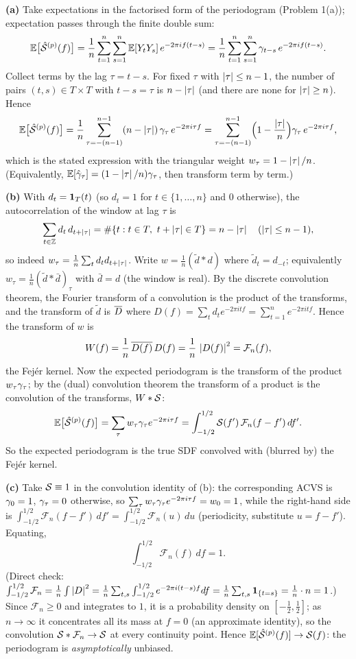 \documentclass[11pt]{article}
\begin{document}
\textbf{(a)} Take expectations in the factorised form of the periodogram (Problem 1(a)); expectation passes through the finite double sum:
\[
\mathbb{E}\bigl[\hat{\mathcal{S}}^{(p)}(f)\bigr]
=\frac1n\sum_{t=1}^{n}\sum_{s=1}^{n}\mathbb{E}[Y_tY_s]\,e^{-2\pi i f(t-s)}
=\frac1n\sum_{t=1}^{n}\sum_{s=1}^{n}\gamma_{t-s}\,e^{-2\pi i f(t-s)}.
\]
Collect terms by the lag $\tau=t-s$. For fixed $\tau$ with $\left\lvert \tau \right\rvert\le n-1$, the number of pairs $(t,s)\in T\times T$ with $t-s=\tau$ is $n-\left\lvert \tau \right\rvert$ (and there are none for $\left\lvert \tau \right\rvert\ge n$). Hence
\[
\mathbb{E}\bigl[\hat{\mathcal{S}}^{(p)}(f)\bigr]
=\frac1n\sum_{\tau=-(n-1)}^{n-1}(n-\left\lvert \tau \right\rvert)\,\gamma_\tau\,e^{-2\pi i\tau f}
=\sum_{\tau=-(n-1)}^{n-1}\Bigl(1-\frac{\left\lvert \tau \right\rvert}{n}\Bigr)\gamma_\tau\,e^{-2\pi i\tau f},
\]
which is the stated expression with the triangular weight $w_\tau=1-\left\lvert \tau \right\rvert/n$. (Equivalently, $\mathbb{E}[\hat{\gamma}_\tau]=(1-\left\lvert \tau \right\rvert/n)\gamma_\tau$, then transform term by term.)

\textbf{(b)} With $d_t=\mathbf{1}_T(t)$ (so $d_t=1$ for $t\in\{1,\dots,n\}$ and $0$ otherwise), the autocorrelation of the window at lag $\tau$ is
\[
\sum_{t\in\mathbb{Z}} d_t\,d_{t+\left\lvert \tau \right\rvert}=\#\{t: t\in T,\ t+\left\lvert \tau \right\rvert\in T\}=n-\left\lvert \tau \right\rvert\quad(\left\lvert \tau \right\rvert\le n-1),
\]
so indeed $w_\tau=\frac1n\sum_t d_t d_{t+\left\lvert \tau \right\rvert}$. Write $w=\frac1n(\tilde d * d)$ where $\tilde d_t=d_{-t}$; equivalently $w_\tau=\frac1n(\tilde d * \bar d)_\tau$ with $\bar d=d$ (the window is real). By the discrete convolution theorem, the Fourier transform of a convolution is the product of the transforms, and the transform of $\tilde d$ is $\overline{D}$ where $D(f)=\sum_{t} d_t e^{-2\pi i t f}=\sum_{t=1}^{n}e^{-2\pi i t f}$. Hence the transform of $w$ is
\[
W(f)=\frac1n\,\overline{D(f)}\,D(f)=\frac1n\,\left\lvert D(f) \right\rvert^2=\mathcal F_n(f),
\]
the Fej\'er kernel. Now the expected periodogram is the transform of the product $w_\tau\gamma_\tau$; by the (dual) convolution theorem the transform of a product is the convolution of the transforms, $W * \mathcal{S}$:
\[
\mathbb{E}\bigl[\hat{\mathcal{S}}^{(p)}(f)\bigr]
=\sum_\tau w_\tau\gamma_\tau e^{-2\pi i\tau f}
=\int_{-1/2}^{1/2}\mathcal{S}(f')\,\mathcal F_n(f-f')\,df'.
\]
So the expected periodogram is the true SDF convolved with (blurred by) the Fej\'er kernel.

\textbf{(c)} Take $\mathcal{S}\equiv1$ in the convolution identity of (b): the corresponding ACVS is $\gamma_0=1$, $\gamma_\tau=0$ otherwise, so $\sum_\tau w_\tau\gamma_\tau e^{-2\pi i\tau f}=w_0=1$, while the right-hand side is $\int_{-1/2}^{1/2}\mathcal F_n(f-f')\,df'=\int_{-1/2}^{1/2}\mathcal F_n(u)\,du$ (periodicity, substitute $u=f-f'$). Equating,
\[
\int_{-1/2}^{1/2}\mathcal F_n(f)\,df=1.
\]
(Direct check: $\int_{-1/2}^{1/2}\mathcal F_n=\frac1n\int\left\lvert D \right\rvert^2=\frac1n\sum_{t,s}\int_{-1/2}^{1/2}e^{-2\pi i(t-s)f}df=\frac1n\sum_{t,s}\mathbf{1}_{\{t=s\}}=\frac1n\cdot n=1$.) Since $\mathcal F_n\ge0$ and integrates to $1$, it is a probability density on $[-\tfrac12,\tfrac12]$; as $n\to\infty$ it concentrates all its mass at $f=0$ (an approximate identity), so the convolution $\mathcal{S} * \mathcal F_n\to\mathcal{S}$ at every continuity point. Hence $\mathbb{E}[\hat{\mathcal{S}}^{(p)}(f)]\to\mathcal{S}(f)$: the periodogram is \emph{asymptotically} unbiased.
\end{document}
